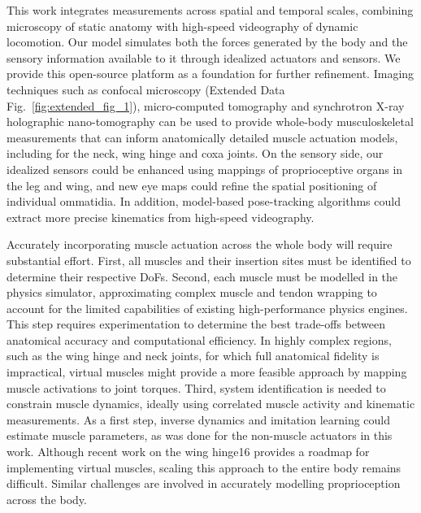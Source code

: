 \documentclass[sn-mathphys-num]{sn-jnl}%
\theoremstyle{thmstyleone}	%
\theoremstyle{thmstyletwo}	%
\theoremstyle{thmstylethree}	%
\begin{document}
This work integrates measurements across spatial and temporal scales, combining microscopy of static anatomy with high-speed videography of dynamic locomotion. 
Our model simulates both the forces generated by the body and the sensory information available to it through idealized actuators and sensors. 
We provide this open-source platform as a foundation for further refinement. 
Imaging techniques such as confocal microscopy (Extended Data Fig.~\ref{fig:extended_fig_1}), micro-computed tomography\cite{lobato2022neuromechfly} and synchrotron X-ray holographic nano-tomography\cite{kuan2020dense} can be used to provide whole-body musculoskeletal measurements that can inform anatomically detailed muscle actuation models, including for the neck\cite{gorko2024motor}, wing hinge\cite{melis2024machine} and coxa\cite{kuan2020dense,mamiya2023biomechanical} joints. 
On the sensory side, our idealized sensors could be enhanced using mappings of proprioceptive organs in the leg and wing\cite{kuan2020dense,mamiya2023biomechanical}, and new eye maps could refine the spatial positioning of individual ommatidia\cite{zhao2025eye}. 
In addition, model-based pose-tracking algorithms could extract more precise kinematics from high-speed videography\cite{bolanos2021three,plum2023replicant}.



Accurately incorporating muscle actuation across the whole body will require substantial effort. 
First, all muscles and their insertion sites must be identified to determine their respective DoFs. 
Second, each muscle must be modelled in the physics simulator, approximating complex muscle and tendon wrapping to account for the limited capabilities of existing high-performance physics engines\cite{todorov2012mujoco,makoviychuk2021isaac}. 
This step requires experimentation to determine the best trade-offs between anatomical accuracy and computational efficiency. 
In highly complex regions, such as the wing hinge and neck joints, for which full anatomical fidelity is impractical, virtual muscles might provide a more feasible approach by mapping muscle activations to joint torques. 
Third, system identification is needed to constrain muscle dynamics, ideally using correlated muscle activity and kinematic measurements\cite{melis2024machine}. 
As a first step, inverse dynamics and imitation learning could estimate muscle parameters, as was done for the non-muscle actuators in this work. 
Although recent work on the wing hinge16 provides a roadmap for implementing virtual muscles, scaling this approach to the entire body remains difficult. 
Similar challenges are involved in accurately modelling proprioception across the body.
\end{document}
